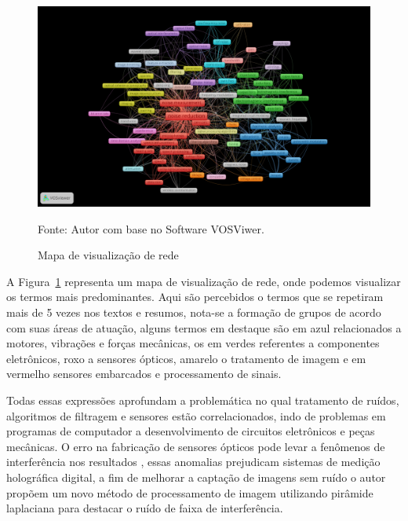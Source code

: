 \begin{figure}[H]
	\centering
	\includegraphics[width=15cm]{anexos/ris/IEEE/Noise_reduction_and_noise_abatement_andsensor_filtering_algorithm/network_visualization_with_lines.png}
	\caption{Mapa de visualização de rede}
	Fonte: Autor com base no Software VOSViwer.
	\label{fig: network_visualization_with_lines}
\end{figure}

A Figura~\ref{fig: network_visualization_with_lines} representa um mapa de visualização de rede, onde podemos visualizar os termos mais predominantes. Aqui são percebidos o termos que se repetiram mais de 5 vezes nos textos e resumos, nota-se a formação de grupos de acordo com suas áreas de atuação, alguns termos em destaque são em azul relacionados a motores, vibrações e forças mecânicas, os em verdes referentes a componentes eletrônicos, roxo a sensores ópticos, amarelo o tratamento de imagem e em vermelho sensores embarcados e processamento de sinais. 


Todas essas expressões aprofundam a problemática no qual tratamento de ruídos, algoritmos de filtragem e sensores estão correlacionados, indo de problemas em programas de computador a desenvolvimento de circuitos eletrônicos e peças mecânicas. O erro na fabricação de sensores ópticos pode levar a fenômenos de interferência nos resultados \cite{liu_interference_stripe}, essas anomalias prejudicam sistemas de medição holográfica digital, a fim de melhorar a captação de imagens sem ruído o autor propõem um novo método de processamento de imagem utilizando pirâmide laplaciana para destacar o ruído de faixa de interferência.

